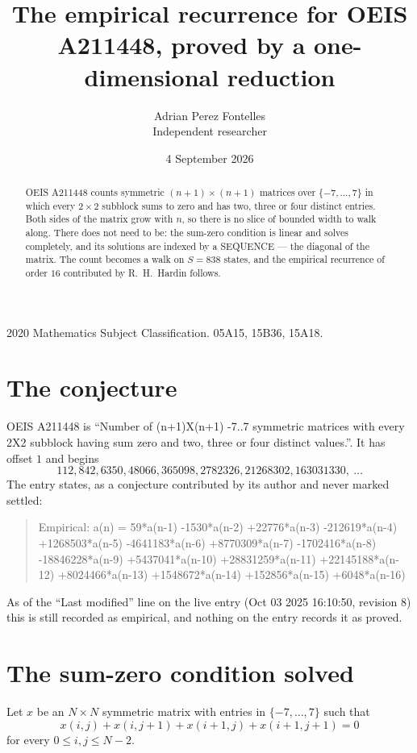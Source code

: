 \documentclass[11pt,a4paper]{article}
\title{The empirical recurrence for OEIS A211448, proved by a one-dimensional reduction}
\author{Adrian Perez Fontelles\\ \small Independent researcher}
\date{4 September 2026}
\theoremstyle{plain}
\theoremstyle{definition}
\begin{document}
\maketitle

\begin{abstract}
OEIS A211448 counts symmetric $(n+1)\times(n+1)$ matrices over
$\{-7,\dots,7\}$ in which every $2\times2$ subblock sums to zero and has two, three or four distinct
entries. Both sides of the matrix grow with $n$, so there is no slice of bounded width to walk
along. There does not need to be: the sum-zero condition is linear and solves completely, and
its solutions are indexed by a SEQUENCE --- the diagonal of the matrix. The count becomes a walk
on $S=838$ states, and the empirical recurrence of order $16$ contributed by R.~H.~Hardin
follows.
\end{abstract}

\noindent\small 2020 Mathematics Subject Classification. 05A15, 15B36, 15A18.\normalsize

\section{The conjecture}

OEIS A211448 is ``Number of (n+1)X(n+1) -7..7 symmetric matrices with every 2X2 subblock having sum zero and two, three or four distinct values.''. It has offset $1$ and begins
\[
112, 842, 6350, 48066, 365098, 2782326, 21268302, 163031330,\ \dots
\]
The entry states, as a conjecture contributed by its author and never marked settled:
\begin{quote}
Empirical: a(n) = 59*a(n-1) -1530*a(n-2) +22776*a(n-3) -212619*a(n-4) +1268503*a(n-5) -4641183*a(n-6) +8770309*a(n-7) -1702416*a(n-8) -18846228*a(n-9) +5437041*a(n-10) +28831259*a(n-11) +22145188*a(n-12) +8024466*a(n-13) +1548672*a(n-14) +152856*a(n-15) +6048*a(n-16)
\end{quote}
As of the ``Last modified'' line on the live entry (Oct 03 2025 16:10:50, revision 8) this is still
recorded as empirical, and nothing on the entry records it as proved.

\section{The sum-zero condition solved}

Let $x$ be an $N\times N$ symmetric matrix with entries in $\{-7,\dots,7\}$ such that
\[
x(i,j)+x(i,j{+}1)+x(i{+}1,j)+x(i{+}1,j{+}1)=0
\]
for every $0\le i,j\le N-2$.
\end{document}
